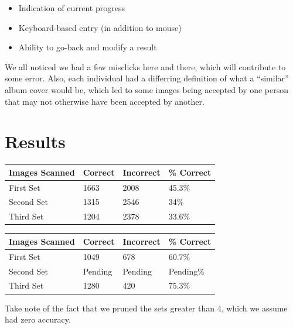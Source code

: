 \documentclass[11pt,a4paper,titlepage]{article}
\begin{document}
\begin{itemize}
    \item
        Indication of current progress
    \item
        Keyboard-based entry (in addition to mouse)
    \item
        Ability to go-back and modify a result
\end{itemize}

We all noticed we had a few misclicks here and there, which will contribute to
some error.  Also, each individual had a differring definition of what a
``similar'' album cover would be, which led to some images being accepted by
one person that may not otherwise have been accepted by another.

\section{Results}

\begin{minipage}{\linewidth}
\centering
\begin{tabular}{|l|l|l|l|}
\hline
Images Scanned & Correct & Incorrect & \% Correct \\ \hline
First Set    & 1663    & 2008      & 45.3\% \\ \hline
Second Set   & 1315    & 2546      & 34\% \\ \hline
Third Set    & 1204    & 2378      & 33.6\% \\ \hline
\end{tabular}
\end{minipage}

\begin{minipage}{\linewidth}
\centering
\begin{tabular}{|l|l|l|l|}
\hline
Images Scanned & Correct & Incorrect & \% Correct \\ \hline
First Set    & 1049    & 678      & 60.7\% \\ \hline
Second Set   & Pending    & Pending & Pending\% \\ \hline
Third Set    & 1280    & 420      & 75.3\% \\ \hline
\end{tabular}
\end{minipage}

Take note of the fact that we pruned the sets greater than 4, which we assume
had zero accuracy.

\end{document}
